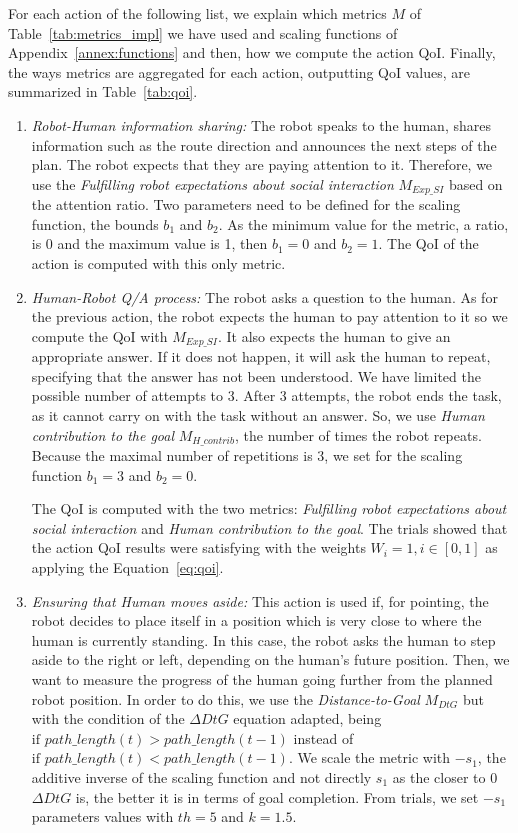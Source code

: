 \documentclass[a4paper,11pt,twoside]{StyleThese}
\begin{document}
For each action of the following list, we explain which metrics $M$ of Table~\ref{tab:metrics_impl} we have used and scaling functions of Appendix~\ref{annex:functions} and then, how we compute the action QoI. Finally, the ways metrics are aggregated for each action, outputting QoI values, are summarized in Table~\ref{tab:qoi}.
\begin{enumerate}[label=(\alph*)]
	\item \label{list_act:info} \emph{Robot-Human information sharing: }The robot speaks to the human, shares information such as the route direction and announces the next steps of the plan. The robot expects that they are paying attention to it. Therefore, we use the \emph{Fulfilling robot expectations about social interaction} $M_{Exp\_SI}$ based on the attention ratio. Two parameters need to be defined for the scaling function, the bounds $b_1$ and $b_2$. As the minimum value for the metric, a ratio, is 0 and the maximum value is 1, then $b_1=0$ and $b_2=1$. 
	The QoI of the action is computed with this only metric.
	
	\item \label{list_act:qa} \emph{Human-Robot Q/A process: } The robot asks a question to the human. As for the previous action, the robot expects the human to pay attention to it so we compute the QoI with $M_{Exp\_SI}$. It also expects the human to give an appropriate answer. If it does not happen, it will ask the human to repeat, specifying that the answer has not been understood. We have limited the possible number of attempts to 3. After 3 attempts, the robot ends the task, as it cannot carry on with the task without an answer. So, we use \emph{Human contribution to the goal} $M_{H\_contrib}$, the number of times the robot repeats. Because the maximal number of repetitions is 3, we set for the scaling function $b_1=3$ and $b_2=0$.
	
	The QoI is computed with the two metrics: \emph{Fulfilling robot expectations about social interaction} and \emph{Human contribution to the goal}.
	The trials showed that the action QoI results were satisfying with the weights $W_i=1, i \in [0,1]$ as applying the Equation~\eqref{eq:qoi}.
	
	\item \label{list_act:moves_aside} \emph{Ensuring that Human  moves aside: }This action is used if, for pointing, the robot decides to place itself in a position which is very close to where the human is currently standing. In this case, the robot asks the human to step aside to the right or left, depending on the human's future position. Then, we want to measure the progress of the human going further from the planned robot position. In order to do this, we use the \emph{Distance-to-Goal} $M_{DtG}$ but with the condition of the $\Delta DtG$ equation adapted, being $\text{if } path\_length(t) >  path\_length(t-1)$ instead of $\text{if } path\_length(t) <  path\_length(t-1)$. We scale the metric with  $-s_1$, the additive inverse of the scaling function and not directly $s_1$ as the closer to 0 $\Delta DtG$ is, the better it is in terms of goal completion. From trials, we set $-s_1$ parameters values with $th=5$ and $k=1.5$.
	

\end{enumerate}
\end{document}

